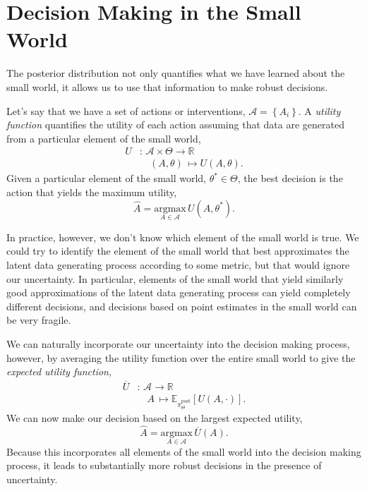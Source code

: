 \section{Decision Making in the Small World}

The posterior distribution not only quantifies what we have learned
about the small world, it allows us to use that information to make
robust decisions.

Let's say that we have a set of actions or interventions, 
$\mathcal{A} = \left\{ A_{i} \right\}$.  A \emph{utility function}
quantifies the utility of each action assuming that data are
generated from a particular element of the small world,
%
\begin{align*}
U &: \,\mathcal{A} \times \Theta \rightarrow \mathbb{R}
\\
& \quad \left(A, \theta \right) \, \mapsto U(A, \theta).
\end{align*}
%
Given a particular element of the small world, 
$\theta^{*} \in \Theta$, the best decision is the action that 
yields the maximum utility,
%
\begin{equation*}
\hat{A} = \underset{A \in \mathcal{A}}{\mathrm{argmax}} \,
U \! \left( A, \theta^{*} \right).
\end{equation*}

In practice, however, we don't know which element of the
small world is true.  We could try to identify the element of
the small world that best approximates the latent data generating 
process according to some metric, but that would ignore our 
uncertainty.  In particular, elements of the small world that 
yield similarly good approximations of the latent data generating
process can yield completely different decisions, and decisions
based on point estimates in the small world can be very fragile.

We can naturally incorporate our uncertainty into the decision
making process, however, by averaging the utility function over
the entire small world to give the \emph{expected
utility function},
%
\begin{align*}
\overline{U} &: \,\mathcal{A} \rightarrow \mathbb{R}
\\
& \quad A \, \mapsto 
\mathbb{E}_{\pi^{\mathrm{post}}_{\Theta}} \! \left[ U(A, \cdot) \right].
\end{align*}
%
We can now make our decision based on the largest expected
utility,
%
\begin{equation*}
\hat{A} = \underset{A \in \mathcal{A}}{\mathrm{argmax}} \,
\overline{U} \! \left( A \right).
\end{equation*}
%
Because this incorporates all elements of the small world into
the decision making process, it leads to substantially more
robust decisions in the presence of uncertainty.

